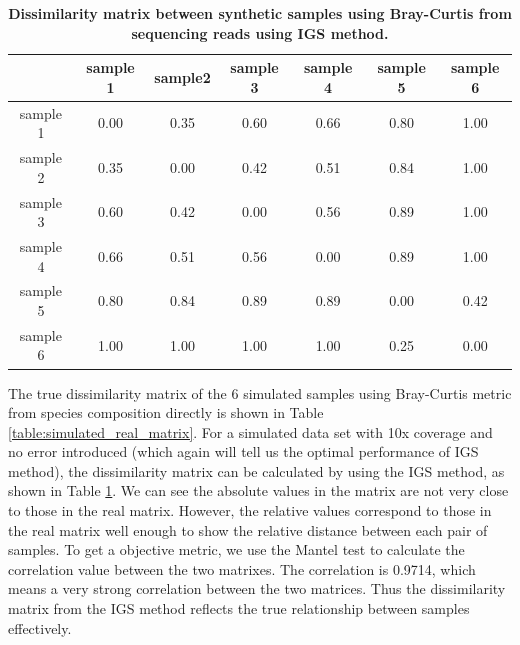 \documentclass{article}
\begin{document}
\begin{table}[!ht]
\centering
\begin{tabular}{|c|c|c|c|c|c|c|}
\hline
                  & sample 1 & sample2 & sample 3 & sample 4 & sample 5 & sample 6 \\ \hline
sample 1 & 0.00              & 0.35             & 0.60              & 0.66              & 0.80              & 1.00              \\ 
sample 2 & 0.35              & 0.00             & 0.42              & 0.51              & 0.84              & 1.00              \\ 
sample 3 & 0.60              & 0.42             & 0.00              & 0.56              & 0.89              & 1.00              \\ 
sample 4 & 0.66              & 0.51             & 0.56              & 0.00              & 0.89              & 1.00              \\ 
sample 5 & 0.80              & 0.84             & 0.89              & 0.89              & 0.00              & 0.42              \\ 
sample 6 & 1.00              & 1.00             & 1.00              & 1.00              & 0.25              & 0.00              \\ \hline
\end{tabular}
\caption{\bf Dissimilarity matrix between synthetic samples using Bray-Curtis
from sequencing reads using IGS method. }
\label{table:simulated_matrix1}
\end{table}


The true dissimilarity matrix of the 6 simulated samples using Bray-Curtis 
metric from species composition directly is shown in Table \ref{table:simulated_real_matrix}.
For a simulated data set with 10x coverage and no error introduced 
(which again will tell us the optimal performance of IGS method), the dissimilarity 
matrix can be calculated by using the IGS method, as shown in Table 
\ref{table:simulated_matrix1}. We can see the absolute values in the matrix 
are not very close to those in the real matrix. However, the relative values 
correspond to those in the real matrix well enough to show the relative distance 
between each pair of samples. To get a objective metric, we use the
Mantel \cite{Mantel1967} test to calculate the correlation value between the two 
matrixes.
The correlation is 0.9714, which means a very strong correlation 
between the two matrices. Thus the dissimilarity matrix from the IGS method 
reflects the true relationship between samples effectively.
\end{document}
